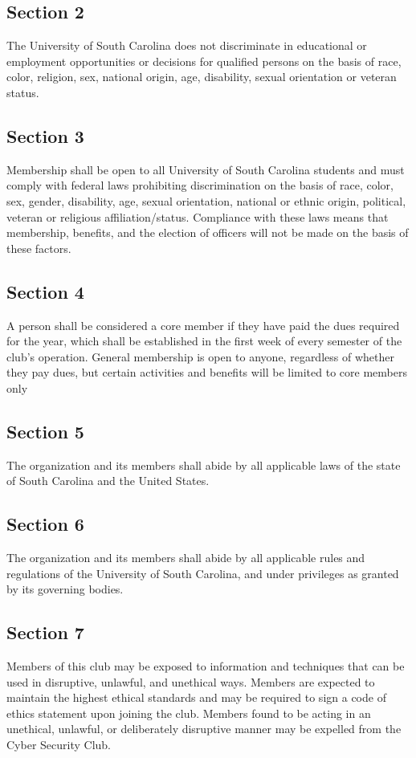 \documentclass[10pt]{article}
\begin{document}
\subsection*{Section 2}
The University of South Carolina does not discriminate in educational or employment opportunities or
decisions for qualified persons on the basis of race, color, religion, sex, national origin, age, disability,
sexual orientation or veteran status.
\subsection*{Section 3}
Membership shall be open to all University of South Carolina students and must comply with federal
laws prohibiting discrimination on the basis of race, color, sex, gender, disability, age, sexual
orientation, national or ethnic origin, political, veteran or religious affiliation/status. Compliance with
these laws means that membership, benefits, and the election of officers will not be made on the basis
of these factors. 
\subsection*{Section 4}
A person shall be considered a core member if they have paid the dues required for the year, which
shall be established in the first week of every semester of the club’s operation. General membership is 
open to anyone, regardless of whether they pay dues, but certain activities and benefits will be limited
to core members only
\subsection*{Section 5}
The organization and its members shall abide by all applicable laws of the state of South Carolina and
the United States.
\subsection*{Section 6}
The organization and its members shall abide by all applicable rules and regulations of the University
of South Carolina, and under privileges as granted by its governing bodies.
\subsection*{Section 7}
Members of this club may be exposed to information and techniques that can be used in disruptive,
unlawful, and unethical ways. Members are expected to maintain the highest ethical standards and may
be required to sign a code of ethics statement upon joining the club. Members found to be acting in an
unethical, unlawful, or deliberately disruptive manner may be expelled from the Cyber Security Club.
\vspace{0.2in}
\end{document}

